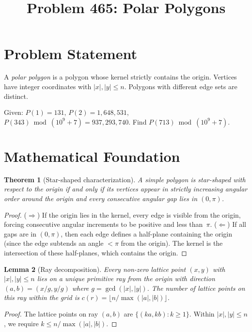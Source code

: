 \documentclass[11pt]{article}
\title{Problem 465: Polar Polygons}
\author{}
\date{}
\newtheorem{theorem}{Theorem}
\newtheorem{lemma}[theorem]{Lemma}
\begin{document}
\maketitle

\section{Problem Statement}

A \emph{polar polygon} is a polygon whose kernel strictly contains the origin. Vertices have integer coordinates with $|x|, |y| \le n$. Polygons with different edge sets are distinct.

Given: $P(1) = 131$, $P(2) = 1{,}648{,}531$, $P(343) \bmod (10^9+7) = 937{,}293{,}740$. Find $P(713) \bmod (10^9+7)$.

\section{Mathematical Foundation}

\begin{theorem}[Star-shaped characterization]
\label{thm:star}
A simple polygon is star-shaped with respect to the origin if and only if its vertices appear in strictly increasing angular order around the origin and every consecutive angular gap lies in $(0, \pi)$.
\end{theorem}

\begin{proof}
($\Rightarrow$) If the origin lies in the kernel, every edge is visible from the origin, forcing consecutive angular increments to be positive and less than~$\pi$. ($\Leftarrow$) If all gaps are in $(0, \pi)$, then each edge defines a half-plane containing the origin (since the edge subtends an angle $< \pi$ from the origin). The kernel is the intersection of these half-planes, which contains the origin.
\end{proof}

\begin{lemma}[Ray decomposition]
\label{lem:ray}
Every non-zero lattice point $(x, y)$ with $|x|, |y| \le n$ lies on a unique primitive ray from the origin with direction $(a, b) = (x/g, y/g)$ where $g = \gcd(|x|, |y|)$. The number of lattice points on this ray within the grid is $c(r) = \lfloor n / \max(|a|, |b|) \rfloor$.
\end{lemma}

\begin{proof}
The lattice points on ray $(a, b)$ are $\{(ka, kb) : k \ge 1\}$. Within $|x|, |y| \le n$, we require $k \le n / \max(|a|, |b|)$.
\end{proof}
\end{document}
